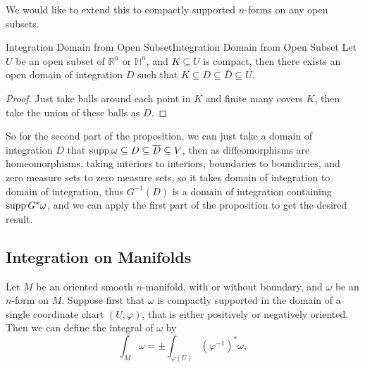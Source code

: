 \documentclass[../main.tex]{subfiles}
\begin{document}
We would like to extend this to compactly supported $n$-forms on any open subsets.
\begin{lemma}{Integration Domain from Open Subset}{Integration Domain from Open Subset}
  Let $U$ be an open subset of $\mathbb{R}^n$ or $\mathbb{H}^n$, and $K \subseteq U$ is compact, then there exists an open domain of integration $D$ such that $K \subseteq D \subseteq \overline{D} \subseteq U$.
\end{lemma}
\begin{proof}
  Just take balls around each point in $K$ and finite many covers $K$, then take the union of these balls as $D$.
\end{proof}
So for the second part of the proposition, we can just take a domain of integration $D$ that $\operatorname{supp} \omega \subseteq D \subseteq \overline{D} \subseteq V$, then as diffeomorphisms are homeomorphisms, taking interiors to interiors, boundaries to boundaries, and zero measure sets to zero measure sets, so it takes domain of integration to domain of integration, thus $G^{-1}(D)$ is a domain of integration containing $\operatorname{supp} G^*\omega$, and we can apply the first part of the proposition to get the desired result.

\subsection{Integration on Manifolds}
Let $M$ be an oriented smooth $n$-manifold, with or without boundary, and $\omega$ be an $n$-form on $M$. Suppose first that $\omega$ is compactly supported in the domain of a single coordinate chart $(U,\varphi)$, that is either positively or negatively oriented. Then we can define the integral of $\omega$ by
\begin{equation}
  \int_M \omega = \pm \int_{\varphi(U)} (\varphi^{-1})^*\omega,
\end{equation}
\end{document}

